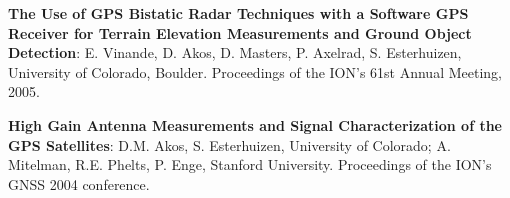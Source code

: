 \begin{resume}
{\bf The Use of GPS Bistatic Radar Techniques with a Software GPS Receiver for Terrain Elevation Measurements and Ground Object Detection}: E. Vinande, D. Akos, D. Masters, P. Axelrad, S. Esterhuizen, University of Colorado, Boulder. Proceedings of the ION's 61st Annual Meeting, 2005.

{\bf High Gain Antenna Measurements and Signal Characterization of the GPS Satellites}: D.M. Akos, S. Esterhuizen, University of Colorado; A. Mitelman, R.E. Phelts, P. Enge, Stanford University. Proceedings of the ION's GNSS 2004 conference.
\end{resume}


% 
